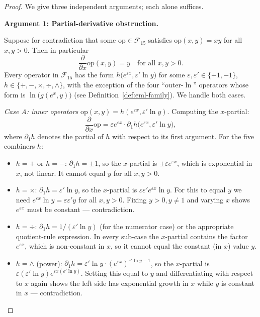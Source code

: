 \documentclass[11pt]{article}
\begin{document}
\begin{proof}
We give three independent arguments; each alone suffices.

\medskip
\noindent\textbf{Argument 1: Partial-derivative obstruction.}

Suppose for contradiction that some $\mathrm{op}\in\mathcal{F}_{15}$ satisfies
$\mathrm{op}(x,y)=xy$ for all $x,y>0$.  Then in particular
\begin{equation}
  \frac{\partial}{\partial x}\mathrm{op}(x,y) = y
  \quad\text{for all }x,y>0.\label{eq:dx}
\end{equation}
Every operator in $\mathcal{F}_{15}$ has the form
$h\bigl(e^{\varepsilon x}, \varepsilon'\ln y\bigr)$ for some
$\varepsilon,\varepsilon'\in\{+1,-1\}$, $h\in\{+,-,\times,\div,\wedge\}$,
with the exception of the four ``outer-$\ln$'' operators whose form is
$\ln\!\bigl(g(e^x, y)\bigr)$ (see Definition~\ref{def:eml-family}).
We handle both cases.

\emph{Case A: inner operators} $\mathrm{op}(x,y) = h(e^{\varepsilon x}, \varepsilon'\ln y)$.
Computing the $x$-partial:
\[
  \frac{\partial}{\partial x}\mathrm{op}
  = \varepsilon e^{\varepsilon x}\cdot \partial_1 h\!\bigl(e^{\varepsilon x},\varepsilon'\ln y\bigr),
\]
where $\partial_1 h$ denotes the partial of $h$ with respect to its first argument.
For the five combiners $h$:
\begin{itemize}
  \item $h=+$ or $h=-$: $\partial_1 h = \pm 1$, so the $x$-partial is $\pm \varepsilon e^{\varepsilon x}$,
        which is exponential in $x$, not linear. It cannot equal $y$ for all $x,y>0$.
  \item $h=\times$: $\partial_1 h = \varepsilon'\ln y$, so the $x$-partial is
        $\varepsilon\varepsilon' e^{\varepsilon x}\ln y$.
        For this to equal $y$ we need $e^{\varepsilon x}\ln y = \varepsilon\varepsilon' y$ for all $x,y>0$.
        Fixing $y>0,y\neq 1$ and varying $x$ shows $e^{\varepsilon x}$ must be constant --- contradiction.
  \item $h=\div$: $\partial_1 h = 1/(\varepsilon'\ln y)$ (for the numerator case) or the
        appropriate quotient-rule expression. In every sub-case the $x$-partial contains
        the factor $e^{\varepsilon x}$, which is non-constant in $x$, so it cannot equal the
        constant (in $x$) value $y$.
  \item $h=\wedge$ (power): $\partial_1 h = \varepsilon'\ln y \cdot (e^{\varepsilon x})^{\varepsilon'\ln y - 1}$,
        so the $x$-partial is $\varepsilon(\varepsilon'\ln y)e^{\varepsilon x(\varepsilon'\ln y)}$.
        Setting this equal to $y$ and differentiating with respect to $x$ again shows the
        left side has exponential growth in $x$ while $y$ is constant in $x$ --- contradiction.
\end{itemize}


\end{proof}
\end{document}
